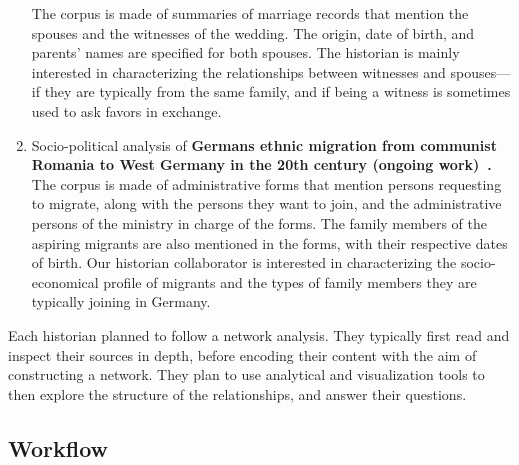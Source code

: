 \begin{enumerate}[nosep,leftmargin=*]
    The corpus is made of summaries of marriage records that mention the spouses and the witnesses of the wedding.
    The origin, date of birth, and parents' names are specified for both spouses.
    The historian is mainly interested in characterizing the relationships between witnesses and spouses---if they are typically from the same family, and if being a witness is sometimes used to ask favors in exchange.
    \item Socio-political analysis of \textbf{Germans ethnic migration from communist Romania to West Germany in the 20th century (ongoing work)~\cite{diminescuMigrationEthnicGermans2020}.}
    The corpus is made of administrative forms that mention persons requesting to migrate, along with the persons they want to join, and the administrative persons of the ministry in charge of the forms.
    The family members of the aspiring migrants are also mentioned in the forms, with their respective dates of birth.
    Our historian collaborator is interested in characterizing the socio-economical profile of migrants and the types of family members they are typically joining in Germany.
\end{enumerate}

Each historian planned to follow a network analysis.
They typically first read and inspect their sources in depth, before encoding their content with the aim of constructing a network.
They plan to use analytical and visualization tools to then explore the structure of the relationships, and answer their questions.

\subsection{Workflow}\label{subsec:hsna-workflow}

